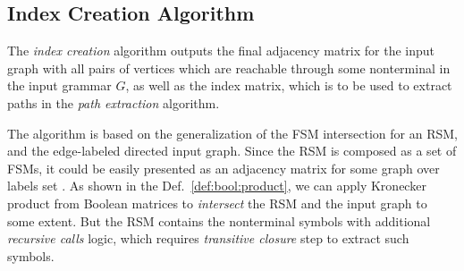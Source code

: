 \subsection{Index Creation Algorithm}

The \textit{index creation} algorithm outputs the final adjacency matrix for the input graph with all pairs of vertices which are reachable through some nonterminal in the input grammar $G$, as well as the index matrix, which is to be used to extract paths in the \textit{path extraction} algorithm.

The algorithm is based on the generalization of the FSM intersection for an RSM,  and the edge-labeled directed input graph.
Since the RSM is composed as a set of FSMs, it could be easily presented as an adjacency matrix for some graph over labels set .
As shown in the Def.~\ref{def:bool:product}, we can apply Kronecker product from Boolean matrices to \textit{intersect} the RSM and the input graph to some extent.
But the RSM contains the nonterminal symbols with additional \textit{recursive calls} logic, which requires \textit{transitive closure} step to extract such symbols.

